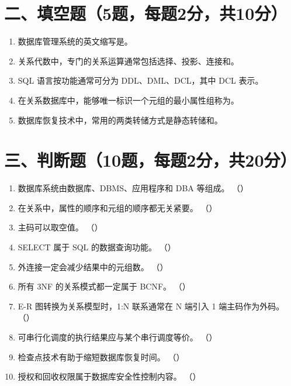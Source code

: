 \documentclass{../../note}
\begin{document}
\section*{二、填空题（5题，每题2分，共10分）}

\begin{enumerate}[itemsep=0.8em]
\item 数据库管理系统的英文缩写是\underline{\hspace{2cm}}。
\item 关系代数中，专门的关系运算通常包括选择、投影、连接和\underline{\hspace{2cm}}。
\item SQL 语言按功能通常可分为 DDL、DML、DCL，其中 DCL 表示\underline{\hspace{3cm}}。
\item 在关系数据库中，能够唯一标识一个元组的最小属性组称为\underline{\hspace{2cm}}。
\item 数据库恢复技术中，常用的两类转储方式是静态转储和\underline{\hspace{2cm}}。
\end{enumerate}

\section*{三、判断题（10题，每题2分，共20分）}

\begin{enumerate}[itemsep=0.6em]
\item 数据库系统由数据库、DBMS、应用程序和 DBA 等组成。 （\hspace{0.8cm}）
\item 在关系中，属性的顺序和元组的顺序都无关紧要。 （\hspace{0.8cm}）
\item 主码可以取空值。 （\hspace{0.8cm}）
\item SELECT 属于 SQL 的数据查询功能。 （\hspace{0.8cm}）
\item 外连接一定会减少结果中的元组数。 （\hspace{0.8cm}）
\item 所有 3NF 的关系模式都一定属于 BCNF。 （\hspace{0.8cm}）
\item E-R 图转换为关系模型时，1:N 联系通常在 N 端引入 1 端主码作为外码。 （\hspace{0.8cm}）
\item 可串行化调度的执行结果应与某个串行调度等价。 （\hspace{0.8cm}）
\item 检查点技术有助于缩短数据库恢复时间。 （\hspace{0.8cm}）
\item 授权和回收权限属于数据库安全性控制内容。 （\hspace{0.8cm}）
\end{enumerate}
\end{document}
